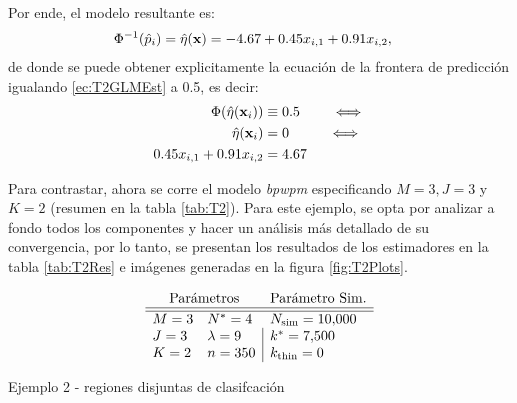 \documentclass[../Main/Main.tex]{subfiles}
\begin{document}
Por ende, el modelo resultante es:
\begin{align}
 \Phi^{-1}(\hat{p}_i) &= \hat{\eta}(\mathbf{x}) = -4.67 + 0.45x_{i,1} + 0.91x_{i,2}, \label{ec:T2GLMEst}
\end{align}
de donde se puede obtener explicitamente la ecuación de la frontera de predicción igualando \eqref{ec:T2GLMEst} a 0.5, es decir:
\begin{align}
	\Phi(\hat{\eta}(\mathbf{x}_i)) &\equiv 0.5 \qquad \iff \nonumber \\
	\hat{\eta}(\mathbf{x}_i) &= 0 \;\;\qquad \iff  \nonumber \\
	0.45x_{i,1} + 0.91x_{i,2} &= 4.67  \label{ec:T2RectaGLM}
\end{align}

Para contrastar, ahora se corre el modelo \textit{bpwpm} especificando $M = 3, J = 3$ y $K =2$ (resumen en la tabla \ref{tab:T2}). Para este ejemplo, se opta por analizar a fondo todos los componentes y hacer un análisis más detallado de su convergencia, por lo tanto, se presentan los resultados de los estimadores en la tabla \ref{tab:T2Res} e imágenes generadas en la figura \ref{fig:T2Plots}.
\begin{table}[h]
$$\paramsmod{3}{3}{2}{4}{9}{350}{\num{10000}}{\num{7500}}{0}$$
\caption{Ejemplo 2 - regiones disjuntas de clasifcación}
\label{tab:T2}
\end{table}
\end{document}
